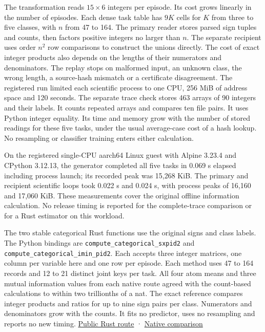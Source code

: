 The transformation reads \(15\times6\) integers per episode. Its cost grows linearly in the number of episodes. Each dense task table has \(9K\) cells for \(K\) from three to five classes, with \(n\) from 47 to 164. The primary reader stores parsed sign tuples and counts, then factors positive integers no larger than \(n\). The separate recipient uses order \(n^2\) row comparisons to construct the unions directly. The cost of exact integer products also depends on the lengths of their numerators and denominators. The replay stops on malformed input, an unknown class, the wrong length, a source-hash mismatch or a certificate disagreement. The registered run limited each scientific process to one CPU, 256 MiB of address space and 120 seconds. The separate trace check stores 463 arrays of 90 integers and their labels. It counts repeated arrays and compares ten file pairs. It uses Python integer equality. Its time and memory grow with the number of stored readings for these five tasks, under the usual average-case cost of a hash lookup. No resampling or classifier training enters either calculation.

On the registered single-CPU aarch64 Linux guest with Alpine 3.23.4 and CPython 3.12.13, the generator completed all five tasks in 0.069 s elapsed including process launch; its recorded peak was 15,268 KiB. The primary and recipient scientific loops took 0.022 s and 0.024 s, with process peaks of 16,160 and 17,060 KiB. These measurements cover the original offline information calculation. No release timing is reported for the complete-trace comparison or for a Rust estimator on this workload.

The two stable categorical Rust functions use the original signs and class labels. The Python bindings are \texttt{compute\_categorical\_sxpid2} and \texttt{compute\_categorical\_imin\_pid2}. Each accepts three integer matrices, one column per variable here and one row per episode. Each method uses 47 to 164 records and 12 to 21 distinct joint keys per task. All four atom means and three mutual information values from each native route agreed with the count-based calculations to within two trillionths of a nat. The exact reference compares integer products and ratios for up to nine sign pairs per class. Numerators and denominators grow with the counts. It fits no predictor, uses no resampling and reports no new timing. \href{https://github.com/sepahead/pid-rs/blob/main/crates/pid-core/src/discrete_pid.rs}{Public Rust route} · \href{https://github.com/sepahead/pid-rs/blob/main/audit/research/robot-wrist-slope-signs/compare_imin_native.py}{Native comparison}

